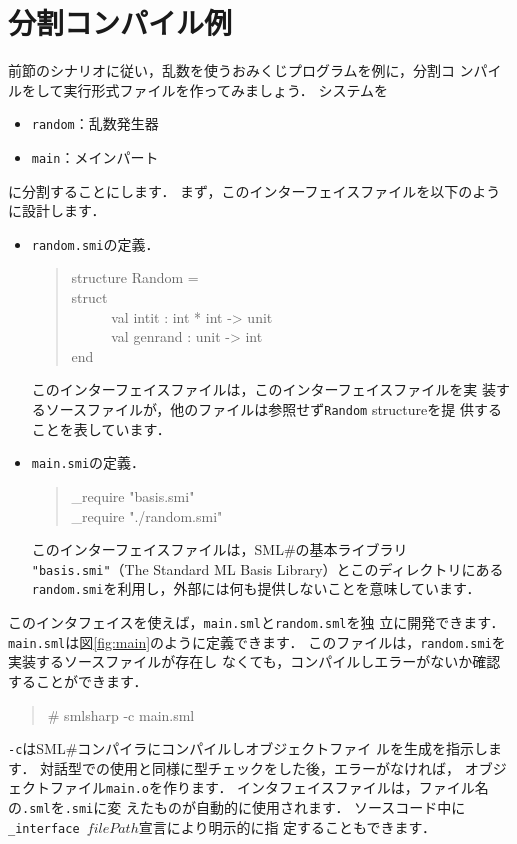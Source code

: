 \documentclass{jbook}
\newcommand{\smlsharp}{SML\#}
\newenvironment{program}{\begin{tt}\begin{quote}}{\end{quote}\end{tt}}
\newcommand{\myem}{\ \ \ \ \  }
\begin{document}
\section{分割コンパイル例}
\label{sec:tutorialSeparateCompilationExample}

	前節のシナリオに従い，乱数を使うおみくじプログラムを例に，分割コ
ンパイルをして実行形式ファイルを作ってみましょう．
	システムを
\begin{itemize}
\item {\tt random}：乱数発生器
\item {\tt main}：メインパート
\end{itemize}
に分割することにします．
	まず，このインターフェイスファイルを以下のように設計します．
\begin{itemize}
\item {\tt random.smi}の定義．
\begin{program}
structure Random =
\\
struct
\\\myem
  val intit : int * int -> unit
\\\myem
  val genrand : unit -> int
\\
end
\end{program}
	このインターフェイスファイルは，このインターフェイスファイルを実
装するソースファイルが，他のファイルは参照せず{\tt Random} structureを提
供することを表しています．
\item {\tt main.smi}の定義．
\begin{program}
\_require "basis.smi"\\
\_require "./random.smi"
\end{program}
	このインターフェイスファイルは，\smlsharp{}の基本ライブラリ{\tt
"basis.smi"}（The Standard ML Basis Library）とこのディレクトリにある
{\tt random.smi}を利用し，外部には何も提供しないことを意味しています．
\end{itemize}

	このインタフェイスを使えば，{\tt main.sml}と{\tt random.sml}を独
立に開発できます．
	{\tt main.sml}は図\ref{fig:main}のように定義できます．
	このファイルは，{\tt random.smi}を実装するソースファイルが存在し
なくても，コンパイルしエラーがないか確認することができます．
\begin{program}
\# smlsharp -c main.sml
\end{program}
	{\tt -c}は\smlsharp{}コンパイラにコンパイルしオブジェクトファイ
ルを生成を指示します．
	対話型での使用と同様に型チェックをした後，エラーがなければ，
オブジェクトファイル{\tt main.o}を作ります．
	インタフェイスファイルは，ファイル名の{\tt .sml}を{\tt .smi}に変
えたものが自動的に使用されます．
	ソースコード中に{\tt \_interface $filePath$}宣言により明示的に指
定することもできます．
\end{document}
